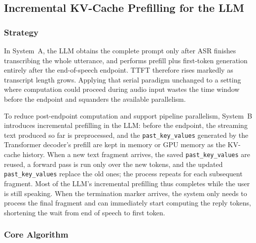 \documentclass[pdflatex,iicol,Numbered,sn-basic]{sn-jnl}%
\begin{document}
\subsection{Incremental KV-Cache Prefilling for the LLM}\label{sec:kv-prefill}

\subsubsection{Strategy}

In System~A, the LLM obtains the complete prompt only after ASR finishes transcribing the whole utterance, and performs prefill plus first-token generation entirely after the end-of-speech endpoint. TTFT therefore rises markedly as transcript length grows. Applying that serial paradigm unchanged to a setting where computation could proceed during audio input wastes the time window before the endpoint and squanders the available parallelism.

To reduce post-endpoint computation and support pipeline parallelism, System~B introduces incremental prefilling in the LLM: before the endpoint, the streaming text produced so far is preprocessed, and the \texttt{past\_key\_values} generated by the Transformer decoder's prefill are kept in memory or GPU memory as the KV-cache history. When a new text fragment arrives, the saved \texttt{past\_key\_values} are reused, a forward pass is run only over the new tokens, and the updated \texttt{past\_key\_values} replace the old ones; the process repeats for each subsequent fragment. Most of the LLM's incremental prefilling thus completes while the user is still speaking. When the termination marker arrives, the system only needs to process the final fragment and can immediately start computing the reply tokens, shortening the wait from end of speech to first token.

\subsubsection{Core Algorithm}
\end{document}
